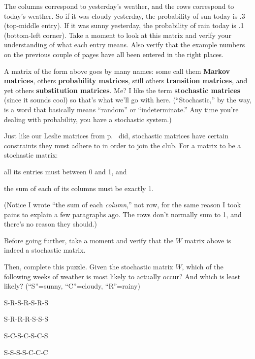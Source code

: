 \begin{alttitles}
The columns correspond to yesterday's weather, and the rows correspond to
today's weather. So if it was cloudy yesterday, the probability of sun today is
.3 (top-middle entry). If it was sunny yesterday, the probability of rain today
is .1 (bottom-left corner). Take a moment to look at this matrix and verify
your understanding of what each entry means. Also verify that the example
numbers on the previous couple of pages have all been entered in the right
places.


A matrix of the form above goes by many names: some call them \textbf{Markov
matrices}, others \textbf{probability matrices}, still others
\textbf{transition matrices}, and yet others \textbf{substitution matrices}.
Me? I like the term \textbf{stochastic matrices} (since it sounds cool) so
that's what we'll go with here. (``Stochastic,'' by the way, is a word that
basically means ``random'' or ``indeterminate.'' Any time you're dealing with
probability, you have a stochastic system.)


Just like our Leslie matrices from p.~\pageref{sec:leslie} did, stochastic
matrices have certain constraints they must adhere to in order to join the
club. For a matrix to be a stochastic matrix:

\begin{compactenum}
\item all its entries must between 0 and 1, and
\item the sum of each of its columns must be exactly 1.
\end{compactenum}

(Notice I wrote ``the sum of each \textit{column},'' not row, for the same
reason I took pains to explain a few paragraphs ago. The rows don't normally
sum to 1, and there's no reason they should.)

Before going further, take a moment and verify that the $W$ matrix above is
indeed a stochastic matrix.

Then, complete this puzzle. Given the stochastic matrix $W$, which of the
following weeks of weather is most likely to actually occur? And which is least
likely? (``S''=sunny, ``C''=cloudy, ``R''=rainy)

\label{markovPuzzle}

\begin{adjustwidth}{38pt}{30pt}
\begin{multicols}{2}
\begin{compactenum}[a.]
\item S-R-S-R-S-R-S
\item S-R-R-R-S-S-S
\item S-C-S-C-S-C-S
\item S-S-S-S-C-C-C
\end{compactenum}
\end{multicols}
\end{adjustwidth}


\end{alttitles}
